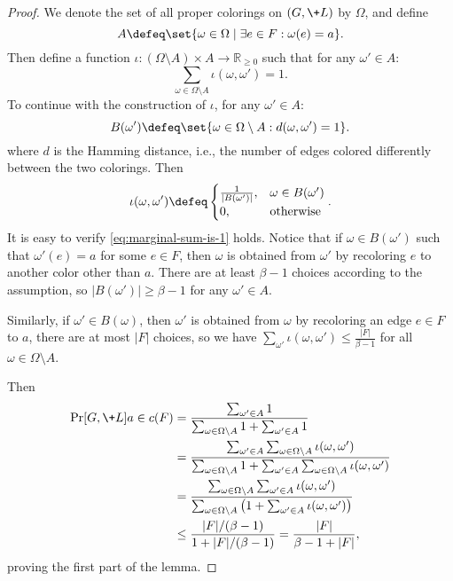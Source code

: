 \begin{proof}
We denote the set of all proper colorings on $(G, \+L)$ by $\Omega$, and define
\[A \defeq \set{\omega\in \Omega \mid \exists e\in F: \omega(e) = a}.\]
Then define a function $\iota: (\Omega\setminus A)\times A\to \mathbb R_{\ge 0} $ such that for any $\omega'\in A$:
\begin{equation}\label{eq:marginal-sum-is-1}
\sum_{\omega\in \Omega\setminus A} \iota(\omega, \omega') = 1.
\end{equation}
To continue with the construction of $\iota$, for any $\omega' \in A$:
\[
    B(\omega')\defeq \set{\omega\in \Omega\setminus A : d(\omega, \omega') = 1}.
\]
where $d$ is the Hamming distance, i.e., the number of edges colored differently between the two colorings.
Then
\begin{align*}
\iota(\omega, \omega') \defeq
\begin{cases}
\frac{1}{|B(\omega')|},& \omega\in B(\omega')\\
0, &\text{otherwise}
\end{cases}.
\end{align*}
It is easy to verify \cref{eq:marginal-sum-is-1} holds.
Notice that if $\omega\in B(\omega')$ such that $\omega'(e) = a$ for some $e\in F$,
then $\omega$ is obtained from $\omega'$ by recoloring $e$ to another color other than $a$. 
There are at least $\beta-1$ choices according to the assumption, so $|B(\omega')|\ge \beta-1$ for any $\omega'\in A$.

Similarly, if $\omega'\in B(\omega)$, then $\omega'$ is obtained from $\omega$ by recoloring an edge $e\in F$ to $a$,
there are at most $|F|$ choices,
so we have $\sum_{\omega'} \iota(\omega, \omega') \le \frac{|F|}{\beta-1}$ for all $\omega\in \Omega\setminus A$.

Then
\begin{align*}
\Pr[G,\+L]{a\in c(F)}
&= \frac{\sum_{\omega'\in A}1}{\sum_{\omega\in \Omega\setminus A} 1 + \sum_{\omega'\in A}1}\\
&= \frac{\sum_{\omega'\in A}\sum_{\omega\in \Omega\setminus A} \iota(\omega, \omega')}
        {\sum_{\omega\in \Omega\setminus A} 1 + \sum_{\omega'\in A}\sum_{\omega\in \Omega\setminus A} \iota(\omega, \omega')}\\
&= \frac{\sum_{\omega\in \Omega\setminus A} \sum_{\omega'\in A} \iota(\omega, \omega')}
        {\sum_{\omega\in \Omega\setminus A} \left(1 + \sum_{\omega'\in A}\iota(\omega, \omega')\right)}\\
&\le \frac{|F|/(\beta-1)}{1 + |F|/(\beta-1)} = \frac{|F|}{\beta-1+|F|},
\end{align*}
proving the first part of the lemma.


\end{proof}
